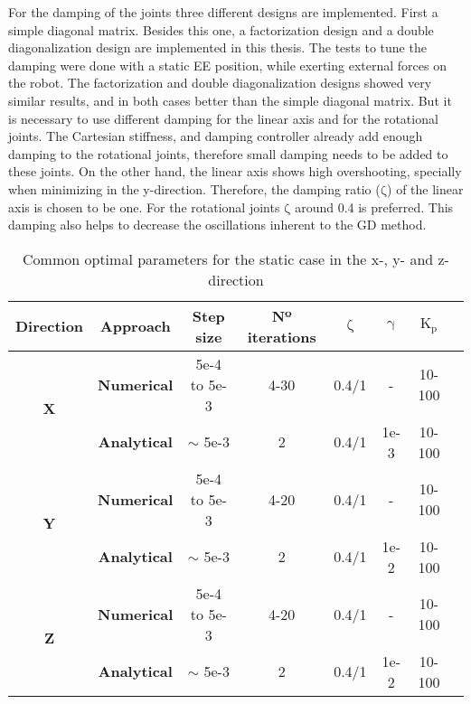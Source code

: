 For the damping of the joints three different designs are implemented. First a simple diagonal matrix. Besides this one, a factorization design and a double diagonalization design \cite{alin_damping} are  implemented in this thesis. The tests to tune the damping were  done with a static EE position, while exerting external forces on the robot. The factorization and double diagonalization designs showed very similar results, and in both cases better than the simple diagonal matrix. But it is necessary to use different damping for the linear axis and for the rotational joints. The Cartesian stiffness, and damping controller  already add enough damping to the rotational joints, therefore small damping needs to be added to these joints. On the other hand, the linear axis shows high overshooting, specially when minimizing in the y-direction. Therefore, the  damping ratio ($\mathrm{\zeta}$) of the linear axis is chosen to be one. For the rotational joints $\mathrm{\zeta}$ around 0.4 is preferred.
This damping also helps to decrease the oscillations inherent to the GD method.







\begin{table}[]
	\centering
	\caption{Common optimal parameters for the static case in the x-, y- and z-direction}
	\label{table:table_SC}
	\begin{tabular}{|c|c|c|c|c|c|c|c|}
		\hline
		\textbf{Direction}          & \textbf{Approach}   & \textbf{Step size} & \textbf{Nº iterations} & \textbf{$\mathrm{\zeta}$} & \textbf{$\mathrm{\gamma}$} & \textbf{$\mathrm{K_p}$}  \\ \hline
		\multirow{2}{*}{\textbf{X}} & \textbf{Numerical}  & 5e-4 to 5e-3       & 4-30                          & 0.4/1                   & -             & 10-100                    \\ 
		& \textbf{Analytical} & $\sim$ 5e-3       & 2                             & 0.4/1                   & 1e-3       & 10-100                          \\ \hline
		\multirow{2}{*}{\textbf{Y}} & \textbf{Numerical}  & 5e-4 to 5e-3       & 4-20                          & 0.4/1                  & -                    & 10-100               \\ 
		& \textbf{Analytical} & $\sim$ 5e-3       & 2                             & 0.4/1                  & 1e-2        & 10-100                        \\ \hline
		\multirow{2}{*}{\textbf{Z}} & \textbf{Numerical}  & 5e-4 to 5e-3       & 4-20                          & 0.4/1                   & -                         & 10-100           \\ 
		& \textbf{Analytical} & $\sim$ 5e-3       & 2                             & 0.4/1                  & 1e-2      & 10-100         \\ \hline                 
	\end{tabular}
\end{table}












